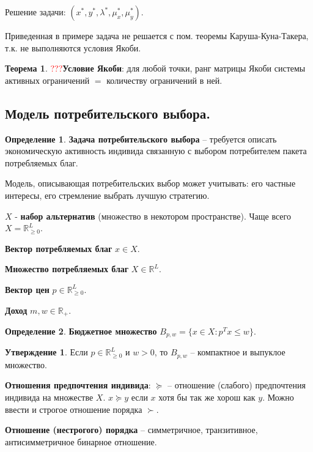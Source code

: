 \documentclass[reqno]{article}
\theoremstyle{definition}
\theoremstyle{definition}
\theoremstyle{definition}
\theoremstyle{definition}
\theoremstyle{definition}
\theoremstyle{definition}
\newtheorem{thm}{Теорема}[section]
\theoremstyle{definition}
\newtheorem*{defi}{Определение}
\theoremstyle{definition}
\theoremstyle{definition}
\newtheorem{state}{Утверждение}[section]
\begin{document}
	Решение задачи: $(x^*, y^*, \lambda^*, \mu_x^*, \mu_y^*)$.
	
	Приведенная в примере задача не решается с пом. теоремы Каруша-Куна-Такера, т.к. не выполняются условия Якоби.
	
	\begin{thm}
		\textcolor{red}{???}\textbf{Условие Якоби}: для любой точки, ранг матрицы Якоби системы активных ограничений $=$ количеству ограничений в ней.			
	\end{thm}
	
	\subsection{Модель потребительского выбора.}
	
	\begin{defi}
		\textbf{Задача потребительского выбора} -- требуется описать экономическую активность индивида связанную с выбором потребителем пакета потребляемых благ.
		
		Модель, описывающая потребительских выбор может учитывать: его частные интересы, его стремление выбрать лучшую стратегию.
	\end{defi}
	
	$X$ - \textbf{набор альтернатив} (множество в некотором пространстве).
	Чаще всего $X = \mathds{R}^L_{\geq 0 }$.
	
	\textbf{Вектор потребляемых благ} $x \in X$.
	
	\textbf{Множество потребляемых благ} $X\in \mathds{R}^L$.
	
	\textbf{Вектор цен} $p \in \mathds{R}^L_{\geq0}$.
	
	\textbf{Доход} $m, w \in \mathds{R}_+$.
	
	\begin{defi}
		\textbf{Бюджетное множество} $B_{p, w} = \{x \in X : p^Tx \leq w\}$.
	\end{defi}
	
	\begin{state}
		Если $p \in \mathds{R}^L_{\geq 0}$ и $w > 0$, то $B_{p,w}$ -- компактное и выпуклое множество.
	\end{state}
	
	\textbf{Отношения предпочтения индивида}: $\succeq$ -- отношение (слабого) предпочтения индивида на множестве $X$. $x \succeq y$ если $x$ хотя бы так же хорош как $y$. Можно ввести и строгое отношение порядка $\succ$.
	
	\textbf{Отношение (нестрогого) порядка} -- симметричное, транзитивное, антисимметричное бинарное отношение.
	
\end{document}
